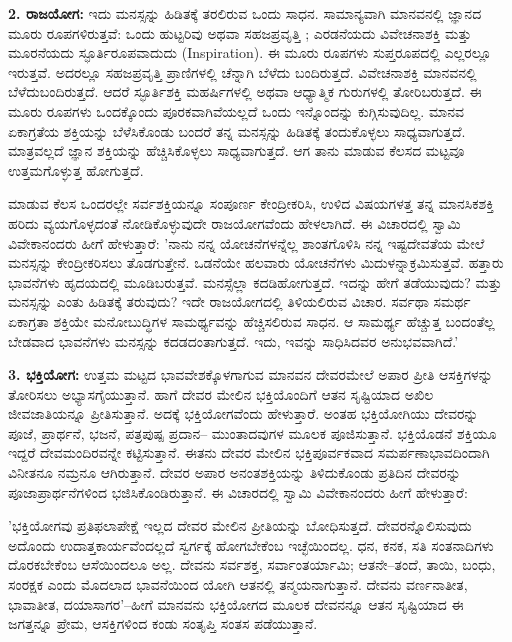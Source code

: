 \textbf{2. ರಾಜಯೋಗ:} ಇದು ಮನಸ್ಸನ್ನು ಹಿಡಿತಕ್ಕೆ ತರಲಿರುವ ಒಂದು ಸಾಧನ. ಸಾಮಾನ್ಯವಾಗಿ ಮಾನವನಲ್ಲಿ ಜ್ಞಾನದ ಮೂರು ರೂಪಗಳಿರುತ್ತವೆ: ಒಂದು ಹುಟ್ಟರಿವು ಅಥವಾ ಸಹಜಪ್ರವೃತ್ತಿ ; ಎರಡನೆಯದು ವಿವೇಚನಾಶಕ್ತಿ  ಮತ್ತು ಮೂರನೆಯದು ಸ್ಫೂರ್ತಿರೂಪವಾದುದು (Inspiration). ಈ ಮೂರು ರೂಪಗಳು ಸುಪ್ತರೂಪದಲ್ಲಿ ಎಲ್ಲರಲ್ಲೂ ಇರುತ್ತವೆ. ಅದರಲ್ಲೂ ಸಹಜಪ್ರವೃತ್ತಿ ಪ್ರಾಣಿಗಳಲ್ಲಿ ಚೆನ್ನಾಗಿ ಬೆಳೆದು ಬಂದಿರುತ್ತದೆ. ವಿವೇಚನಾಶಕ್ತಿ ಮಾನವನಲ್ಲಿ ಬೆಳೆದುಬಂದಿರುತ್ತದೆ. ಆದರೆ ಸ್ಫೂರ್ತಿಶಕ್ತಿ ಮಹರ್ಷಿಗಳಲ್ಲಿ ಅಥವಾ ಆಧ್ಯಾತ್ಮಿಕ ಗುರುಗಳಲ್ಲಿ ತೋರಿಬರುತ್ತದೆ. ಈ ಮೂರು ರೂಪಗಳು ಒಂದಕ್ಕೊಂದು ಪೂರಕವಾಗಿವೆಯಲ್ಲದೆ ಒಂದು ಇನ್ನೊಂದನ್ನು ಕುಗ್ಗಿಸುವುದಿಲ್ಲ. ಮಾನವ ಏಕಾಗ್ರತೆಯ ಶಕ್ತಿಯನ್ನು ಬೆಳೆಸಿಕೊಂಡು ಬಂದರೆ ತನ್ನ ಮನಸ್ಸನ್ನು ಹಿಡಿತಕ್ಕೆ ತಂದುಕೊಳ್ಳಲು ಸಾಧ್ಯವಾಗುತ್ತದೆ. ಮಾತ್ರವಲ್ಲದೆ ಜ್ಞಾನ ಶಕ್ತಿಯನ್ನು ಹೆಚ್ಚಿಸಿಕೊಳ್ಳಲು ಸಾಧ್ಯವಾಗುತ್ತದೆ. ಆಗ ತಾನು ಮಾಡುವ ಕೆಲಸದ ಮಟ್ಟವೂ ಉತ್ತಮಗೊಳ್ಳುತ್ತ ಹೋಗುತ್ತದೆ.

ಮಾಡುವ ಕೆಲಸ ಒಂದರಲ್ಲೇ ಸರ್ವಶಕ್ತಿಯನ್ನೂ ಸಂಪೂರ್ಣ ಕೇಂದ್ರೀಕರಿಸಿ, ಉಳಿದ ವಿಷಯಗಳತ್ತ ತನ್ನ ಮಾನಸಿಕಶಕ್ತಿ ಹರಿದು ವ್ಯಯಗೊಳ್ಳದಂತೆ ನೋಡಿಕೊಳ್ಳುವುದೇ ರಾಜಯೋಗವೆಂದು ಹೇಳಲಾಗಿದೆ. ಈ ವಿಚಾರದಲ್ಲಿ ಸ್ವಾಮಿ ವಿವೇಕಾನಂದರು ಹೀಗೆ ಹೇಳುತ್ತಾರೆ: 'ನಾನು ನನ್ನ ಯೋಚನೆಗಳನ್ನೆಲ್ಲ ಶಾಂತಗೊಳಿಸಿ ನನ್ನ ಇಷ್ಟದೇವತೆಯ ಮೇಲೆ ಮನಸ್ಸನ್ನು ಕೇಂದ್ರೀಕರಿಸಲು ತೊಡಗುತ್ತೇನೆ. ಒಡನೆಯೇ ಹಲವಾರು ಯೋಚನೆಗಳು ಮಿದುಳನ್ನಾಕ್ರಮಿಸುತ್ತವೆ. ಹತ್ತಾರು ಭಾವನೆಗಳು ಹೃದಯದಲ್ಲಿ ಮೂಡಿಬರುತ್ತವೆ. ಮನಸ್ಸೆಲ್ಲಾ ಕದಡಿಹೋಗುತ್ತದೆ. ಇದನ್ನು ಹೇಗೆ ತಡೆಯುವುದು? ಮತ್ತು ಮನಸ್ಸನ್ನು ಎಂತು ಹಿಡಿತಕ್ಕೆ ತರುವುದು? ಇದೇ ರಾಜಯೋಗದಲ್ಲಿ ತಿಳಿಯಲಿರುವ ವಿಚಾರ. ಸರ್ವಥಾ ಸಮರ್ಥ ಏಕಾಗ್ರತಾ ಶಕ್ತಿಯೇ ಮನೋಬುದ್ಧಿಗಳ ಸಾಮರ್ಥ್ಯವನ್ನು ಹೆಚ್ಚಿಸಲಿರುವ ಸಾಧನ. ಆ ಸಾಮರ್ಥ್ಯ ಹೆಚ್ಚುತ್ತ ಬಂದಂತೆಲ್ಲ ಬೇಡವಾದ ಭಾವನೆಗಳು ಮನಸ್ಸನ್ನು ಕದಡದಂತಾಗುತ್ತದೆ. ಇದು, ಇವನ್ನು ಸಾಧಿಸಿದವರ ಅನುಭವವಾಗಿದೆ.'

\textbf{3. ಭಕ್ತಿಯೋಗ:} ಉತ್ತಮ ಮಟ್ಟದ ಭಾವವೇಶಕ್ಕೊಳಗಾಗುವ ಮಾನವನ ದೇವರಮೇಲೆ ಅಪಾರ ಪ್ರೀತಿ ಆಸಕ್ತಿಗಳನ್ನು ತೋರಿಸಲು ಅಭ್ಯಾಸಗೈಯುತ್ತಾನೆ. ಹಾಗೆ ದೇವರ ಮೇಲಿನ ಭಕ್ತಿಯೊಂದಿಗೆ ಆತನ ಸೃಷ್ಟಿಯಾದ ಅಖಿಲ ಜೀವಜಾತಿಯನ್ನೂ ಪ್ರೀತಿಸುತ್ತಾನೆ. ಅದಕ್ಕೆ ಭಕ್ತಿಯೋಗವೆಂದು ಹೇಳುತ್ತಾರೆ. ಅಂತಹ ಭಕ್ತಿಯೋಗಿಯು ದೇವರನ್ನು ಪೂಜೆ, ಪ್ರಾರ್ಥನೆ, ಭಜನೆ, ಪತ್ರಪುಷ್ಪ ಪ್ರದಾನ– ಮುಂತಾದವುಗಳ ಮೂಲಕ ಪೂಜಿಸುತ್ತಾನೆ. ಭಕ್ತಿಯೊಡನೆ ಶಕ್ತಿಯೂ ಇದ್ದರೆ ದೇವಮಂದಿರವನ್ನೇ ಕಟ್ಟಿಸುತ್ತಾನೆ. ಈತನು ದೇವರ ಮೇಲಿನ ಭಕ್ತಿಪೂರ್ವಕವಾದ ಸಮರ್ಪಣಾಭಾವದಿಂದಾಗಿ ವಿನೀತನೂ ನಮ್ರನೂ ಆಗಿರುತ್ತಾನೆ. ದೇವರ ಅಪಾರ ಅನಂತಶಕ್ತಿಯನ್ನು ತಿಳಿದುಕೊಂಡು ಪ್ರತಿದಿನ ದೇವರನ್ನು ಪೂಜಾಪ್ರಾರ್ಥನೆಗಳಿಂದ ಭಜಿಸಿಕೊಂಡಿರುತ್ತಾನೆ. ಈ ವಿಚಾರದಲ್ಲಿ ಸ್ವಾಮಿ ವಿವೇಕಾನಂದರು ಹೀಗೆ ಹೇಳುತ್ತಾರೆ:

'ಭಕ್ತಿಯೋಗವು ಪ್ರತಿಫಲಾಪೇಕ್ಷೆ ಇಲ್ಲದ ದೇವರ ಮೇಲಿನ ಪ್ರೀತಿಯನ್ನು ಬೋಧಿಸುತ್ತದೆ. ದೇವರನ್ನೊಲಿಸುವುದು ಅದೊಂದು ಉದಾತ್ತಕಾರ್ಯವೆಂದಲ್ಲದೆ ಸ್ವರ್ಗಕ್ಕೆ ಹೋಗಬೇಕೆಂಬ ಇಚ್ಛೆಯಿಂದಲ್ಲ. ಧನ, ಕನಕ, ಸತಿ ಸಂತನಾದಿಗಳು ದೊರಕಬೇಕೆಂಬ ಆಸೆಯಿಂದಲೂ ಅಲ್ಲ. ದೇವನು ಸರ್ವಶಕ್ತ, ಸರ್ವಾಂತರ್ಯಾಮಿ; ಆತನೇ–ತಂದೆ, ತಾಯಿ, ಬಂಧು, ಸಂರಕ್ಷಕ ಎಂದು ಮೊದಲಾದ ಭಾವನೆಯಿಂದ ಯೋಗಿ ಆತನಲ್ಲಿ ತನ್ಮಯನಾಗುತ್ತಾನೆ. ದೇವನು ವರ್ಣನಾತೀತ, ಭಾವಾತೀತ, ದಯಾಸಾಗರ'–ಹೀಗೆ ಮಾನವನು ಭಕ್ತಿಯೋಗದ ಮೂಲಕ ದೇವನನ್ನೂ ಆತನ ಸೃಷ್ಟಿಯಾದ ಈ ಜಗತ್ತನ್ನೂ ಪ್ರೇಮ, ಆಸಕ್ತಿಗಳಿಂದ ಕಂಡು ಸಂತೃಪ್ತಿ ಸಂತಸ ಪಡೆಯುತ್ತಾನೆ.

